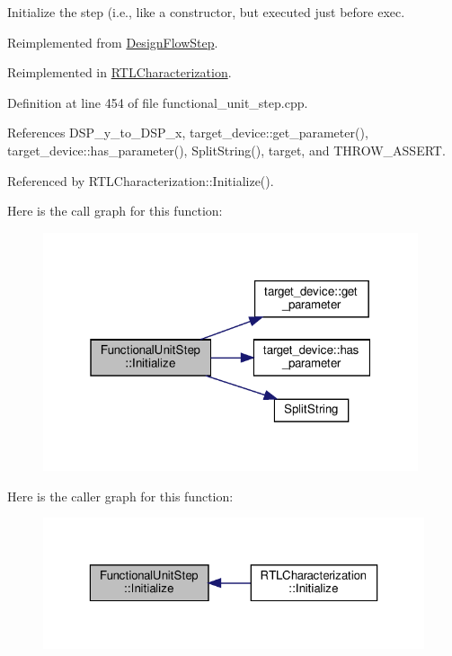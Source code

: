 Initialize the step (i.\+e., like a constructor, but executed just before exec. 



Reimplemented from \hyperlink{classDesignFlowStep_a44b50683382a094976e1d432a7784799}{Design\+Flow\+Step}.



Reimplemented in \hyperlink{classRTLCharacterization_a5763e2ae1d1252dedf0b282a55526fd3}{R\+T\+L\+Characterization}.



Definition at line 454 of file functional\+\_\+unit\+\_\+step.\+cpp.



References D\+S\+P\+\_\+y\+\_\+to\+\_\+\+D\+S\+P\+\_\+x, target\+\_\+device\+::get\+\_\+parameter(), target\+\_\+device\+::has\+\_\+parameter(), Split\+String(), target, and T\+H\+R\+O\+W\+\_\+\+A\+S\+S\+E\+RT.



Referenced by R\+T\+L\+Characterization\+::\+Initialize().

Here is the call graph for this function\+:
\nopagebreak
\begin{figure}[H]
\begin{center}
\leavevmode
\includegraphics[width=313pt]{d0/db7/classFunctionalUnitStep_a7957c47789e5d4a97eb9315872dc8d37_cgraph}
\end{center}
\end{figure}
Here is the caller graph for this function\+:
\nopagebreak
\begin{figure}[H]
\begin{center}
\leavevmode
\includegraphics[width=323pt]{d0/db7/classFunctionalUnitStep_a7957c47789e5d4a97eb9315872dc8d37_icgraph}
\end{center}
\end{figure}


